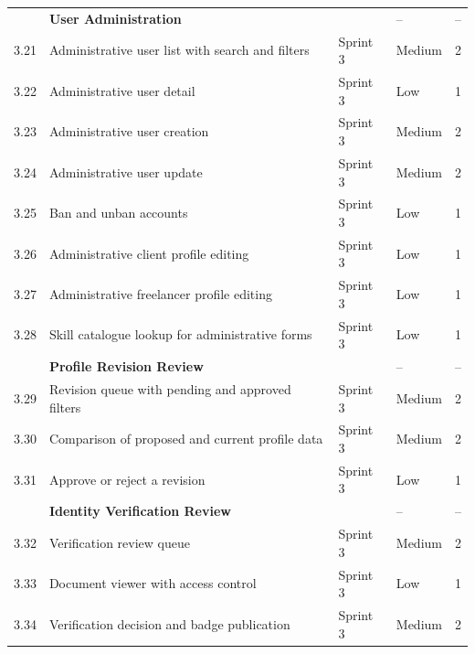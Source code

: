 \begin{longtable}{|
C{1.0cm}|
L{6.9cm}|
C{1.8cm}|
C{2.1cm}|
C{2.3cm}|}
 & \textbf{User Administration} &  & -- & -- \\
3.21 & Administrative user list with search and filters & Sprint 3 & Medium & 2 \\
3.22 & Administrative user detail & Sprint 3 & Low & 1 \\
3.23 & Administrative user creation & Sprint 3 & Medium & 2 \\
3.24 & Administrative user update & Sprint 3 & Medium & 2 \\
3.25 & Ban and unban accounts & Sprint 3 & Low & 1 \\
3.26 & Administrative client profile editing & Sprint 3 & Low & 1 \\
3.27 & Administrative freelancer profile editing & Sprint 3 & Low & 1 \\
3.28 & Skill catalogue lookup for administrative forms & Sprint 3 & Low & 1 \\
\hline

 & \textbf{Profile Revision Review} &  & -- & -- \\
3.29 & Revision queue with pending and approved filters & Sprint 3 & Medium & 2 \\
3.30 & Comparison of proposed and current profile data & Sprint 3 & Medium & 2 \\
3.31 & Approve or reject a revision & Sprint 3 & Low & 1 \\
\hline

 & \textbf{Identity Verification Review} &  & -- & -- \\
3.32 & Verification review queue & Sprint 3 & Medium & 2 \\
3.33 & Document viewer with access control & Sprint 3 & Low & 1 \\
3.34 & Verification decision and badge publication & Sprint 3 & Medium & 2 \\
\hline


\end{longtable}
